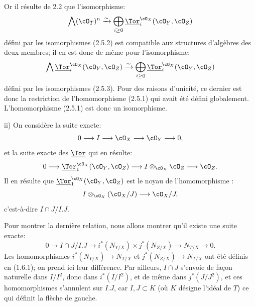 Or il
résulte de 2.2 que l'isomorphisme:
\[
\bigwedge(\cO_T)^n\xrightarrow{\sim}
\bigoplus_{i\ge0}\underline{\Tor}_i^{\cO_X}(\cO_Y,\cO_Z)
\]
défini par les isomorphismes (2.5.2) est compatible aux structures d'algèbres des deux membres; il en est donc de même pour l'isomorphisme:
\[
\bigwedge\underline{\Tor}_i^{\cO_X}(\cO_Y,\cO_Z)\xrightarrow{\sim}
\bigoplus_{i\ge0}\underline{\Tor}_i^{\cO_X}(\cO_Y,\cO_Z)
\]
défini par les isomorphismes (2.5.3). Pour des raisons d'unicité, ce dernier est donc la restriction de l'homomorphisme (2.5.1) qui avait été défini globalement. L'homomorphisme (2.5.1) est donc un isomorphisme.

ii) On considère la suite exacte:
\[
0\longrightarrow I\longrightarrow \cO_X\longrightarrow \cO_Y\longrightarrow0,
\]
et la suite exacte des \(\underline{\Tor}\) qui en résulte:
\[
0\longrightarrow\underline{\Tor}_1^{\cO_X}(\cO_Y,\cO_Z)
\longrightarrow I\otimes_{\cO_X}\cO_Z
\longrightarrow \cO_Z.
\]
Il en résulte que \(\underline{\Tor}_1^{\cO_X}(\cO_Y,\cO_Z)\) est le noyau de l'homomorphisme :
\[
I\otimes_{\cO_X}(\cO_X/J)\longrightarrow \cO_X/J,
\]
c'est-à-dire \(I\cap J/I.J\).

Pour montrer la dernière relation, nous allons montrer qu'il existe une suite exacte:
\[
0\longrightarrow I\cap J/I.J
\longrightarrow i^*(N_{Y/X})\times j^*(N_{Z/X})
\longrightarrow N_{T/X}\longrightarrow0.
\]
Les homomorphismes \(i^*(N_{Y/X})\to N_{T/X}\) et \(j^*(N_{Z/X})\to N_{T/X}\) ont été définis en (1.6.1); on prend ici leur différence. Par ailleurs, \(I\cap J\) s'envoie de façon naturelle dans \(I/I^2\), donc dans \(i^*(I/I^2)\), et de même dans \(j^*(J/J^2)\), et ces homomorphismes s'annulent sur \(I.J\), car \(I,J\subset K\) (où \(K\) désigne l'idéal de \(T\)) ce qui définit la flèche de gauche.

